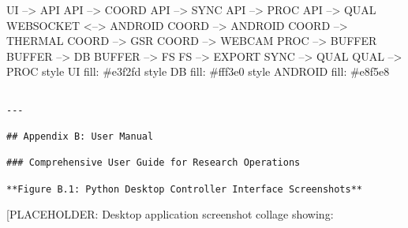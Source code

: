 \documentclass[11pt,a4paper]{report}
\begin{document}
    UI --> API
    API --> COORD
    API --> SYNC
    API --> PROC
    API --> QUAL
    WEBSOCKET <--> ANDROID
    COORD --> ANDROID
    COORD --> THERMAL
    COORD --> GSR
    COORD --> WEBCAM
    PROC --> BUFFER
    BUFFER --> DB
    BUFFER --> FS
    FS --> EXPORT
    SYNC --> QUAL
    QUAL --> PROC
    style UI fill: \#e3f2fd
    style DB fill: \#fff3e0
    style ANDROID fill: \#e8f5e8
\begin{verbatim}

---

## Appendix B: User Manual

### Comprehensive User Guide for Research Operations

**Figure B.1: Python Desktop Controller Interface Screenshots**

\end{verbatim}
[PLACEHOLDER: Desktop application screenshot collage showing:
\end{document}
